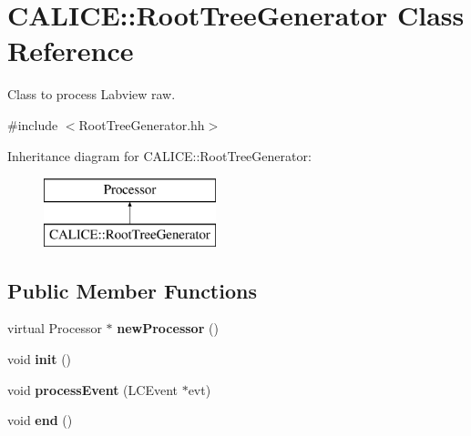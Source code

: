 \section{C\-A\-L\-I\-C\-E\-:\-:Root\-Tree\-Generator Class Reference}
\label{classCALICE_1_1RootTreeGenerator}


Class to process Labview raw.  




{\ttfamily \#include $<$Root\-Tree\-Generator.\-hh$>$}

Inheritance diagram for C\-A\-L\-I\-C\-E\-:\-:Root\-Tree\-Generator\-:\begin{figure}[H]
\begin{center}
\leavevmode
\includegraphics[height=2.000000cm]{classCALICE_1_1RootTreeGenerator}
\end{center}
\end{figure}
\subsection*{Public Member Functions}
\begin{DoxyCompactItemize}
\item 
virtual Processor $\ast$ {\bfseries new\-Processor} ()\label{classCALICE_1_1RootTreeGenerator_a190c4a59fb38f29b4d21ecf4c27758c3}

\item 
void {\bfseries init} ()\label{classCALICE_1_1RootTreeGenerator_a4e25c5be1410bed1779b7c48db8861ae}

\item 
void {\bfseries process\-Event} (L\-C\-Event $\ast$evt)\label{classCALICE_1_1RootTreeGenerator_a4f7d659ca6c9d90f60a13e698d16d369}

\item 
void {\bfseries end} ()\label{classCALICE_1_1RootTreeGenerator_a4659e1ed27fa7d1ce4863945ab3c32ed}

\end{DoxyCompactItemize}

